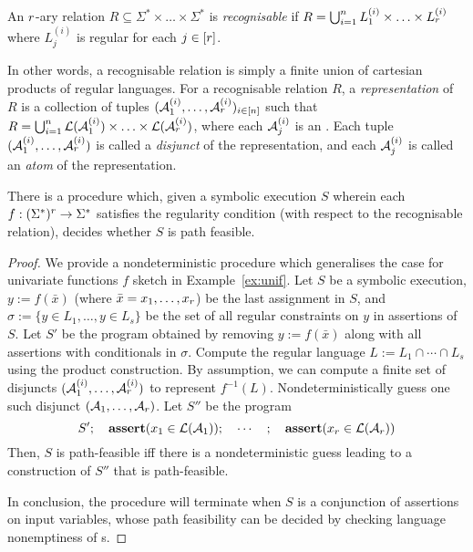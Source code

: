 \begin{definition}
    An $r$-ary relation $R\subseteq \Sigma^*\times \ldots\times \Sigma^*$ is \emph{recognisable}  if $R=\bigcup_{i=1}^n L^{(i)}_1\times \ldots\times L^{(i)}_r$ where $L^{(i)}_j$ is regular for each $j\in [r]$.
%
\end{definition}
In other words, a recognisable relation is simply a finite union of 
cartesian products of regular languages. 
For a recognisable relation $R$, a \emph{representation} of $R$ is a collection of tuples $(\mathcal{A}^{(i)}_1, \ldots, \mathcal{A}^{(i)}_r)_{i\in [n]}$  such that 
$R = \bigcup_{i=1}^n \mathcal{L}(\mathcal{A}^{(i)}_1) \times \ldots\times \mathcal{L}(\mathcal{A}^{(i)}_r)$, where each $\mathcal{A}^{(i)}_j$ is an \FA. 
Each tuple $(\mathcal{A}^{(i)}_1, \ldots, \mathcal{A}^{(i)}_r)$ is called a \emph{disjunct} of the representation, and  each \FA{} $\mathcal{A}^{(i)}_j$ is called an \emph{atom} of the representation.
%
\begin{theorem}
    There is a procedure which, given a symbolic execution $S$ wherein 
    each $f: (\Sigma^*)^r \to \Sigma^*$ satisfies the regularity 
    condition (with respect to the recognisable relation), decides whether $S$
    is path feasible.
    \label{th:gen}
\end{theorem}
%
\begin{proof}
    We provide a nondeterministic procedure which generalises the case for
    univariate functions $f$ sketch in Example~\ref{ex:unif}. Let $S$  be a symbolic execution, $y := f(\bar x)$ (where
    $\bar x = x_1,\ldots,x_r$) be the last
    assignment in $S$, and $\sigma := \{ y \in L_1,\ldots, y \in L_s\}$
    be the set of all regular constraints on $y$ in assertions of $S$.
    Let $S'$ be the program obtained by removing $y := f(\bar x)$ along
    with all assertions with conditionals in $\sigma$.
    Compute the regular language $L := L_1 \cap \cdots \cap L_s$ using
    the product construction. By 
    assumption, we can compute a finite set of disjuncts
    $(\mathcal{A}^{(i)}_1, \ldots, \mathcal{A}^{(i)}_r)$  to represent
    $f^{-1}(L)$. Nondeterministically guess one such disjunct
    $(\mathcal{A}_1, \ldots, \mathcal{A}_r)$. Let $S''$ be the program 
    \[
        S'; \quad \textbf{assert}(x_1 \in \mathcal{L}(\mathcal{A}_1)); \quad \cdots\quad ; \quad \textbf{assert}(x_r \in
        \mathcal{L}(\mathcal{A}_r))
    \]
    Then, $S$ is path-feasible iff there is a nondeterministic guess leading
    to a construction of $S''$ that is path-feasible. 

    In conclusion, the procedure will terminate when $S$ is a conjunction of
    assertions on input variables, whose path feasibility can be
    decided by checking language nonemptiness of \FA{}s.
\end{proof}
